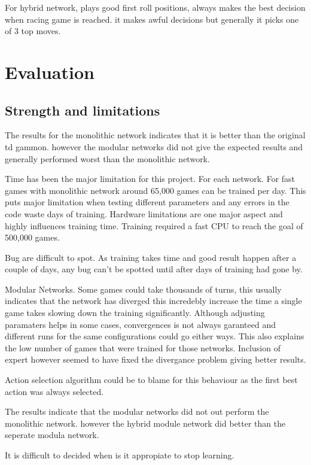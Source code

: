 \documentclass[12pt,a4paper]{article}
\begin{document}
For hybrid network, plays good first roll positions, always makes the best decision when racing game is reached. it makes awful decisions but generally it picks one of 3 top moves.  



\section{Evaluation}
\subsection{Strength and limitations}
The results for the monolithic network indicates that it is better than the original td gammon. however the modular networks did not give the expected results and generally performed worst than the monolithic network.

Time has been the major limitation for this project. For each network. For fast games with monolithic network around 65,000 games can be trained per day. This puts major limitation when testing different parameters and any errors in the code waste days of training. Hardware limitations are one major aspect and highly influences training time. Training required a fast CPU to reach the goal of 500,000 games. 

Bug are difficult to spot. As training takes time and good result happen after a couple of days, any bug can't be spotted until after days of training had gone by. 

Modular Networks. Some games could take thousands of turns, this usually indicates that the network has diverged this incredebly increase the time a single game takes slowing down the training significantly. Although adjusting paramaters helps in some cases, convergences is not always garanteed and different runs for the same configurations could go either ways. This also explains the low number of games that were trained for those networks. Inclusion of expert however seemed to have fixed the divergance problem giving better results. 

Action selection algorithm could be to blame for this behaviour as the first best action was always selected. 

The results indicate that the modular networks did not out perform the monolithic network. however the hybrid module network did better than the seperate modula network. 

It is difficult to decided when is it appropiate to stop learning. 
\end{document}
